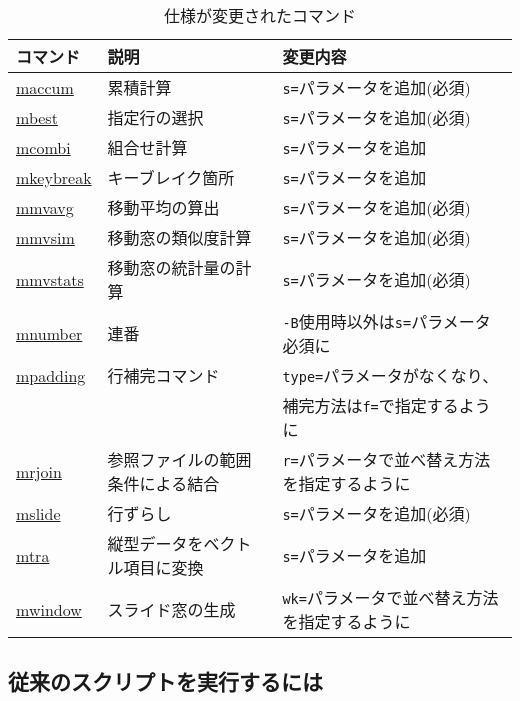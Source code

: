 \begin{table}[!htbp]
\begin{center}
\caption{仕様が変更されたコマンド\label{tbl:changed_commands}}
{\small
  \begin{tabular}{l|l|l} \hline
コマンド                             & 説明               & 変更内容 \\ \hline
\hyperref[sect:maccum]{maccum}       & 累積計算           & \verb|s=|パラメータを追加(必須) \\
\hyperref[sect:mbest]{mbest}         & 指定行の選択       & \verb|s=|パラメータを追加(必須) \\
\hyperref[sect:mcombi]{mcombi}       & 組合せ計算         & \verb|s=|パラメータを追加 \\
\hyperref[sect:mkeybreak]{mkeybreak} & キーブレイク箇所   & \verb|s=|パラメータを追加 \\
\hyperref[sect:mmvavg]{mmvavg}       & 移動平均の算出     & \verb|s=|パラメータを追加(必須) \\
\hyperref[sect:mmvsim]{mmvsim}       & 移動窓の類似度計算 & \verb|s=|パラメータを追加(必須) \\
\hyperref[sect:mmvstats]{mmvstats}   & 移動窓の統計量の計算 & \verb|s=|パラメータを追加(必須) \\
\hyperref[sect:mnumber]{mnumber}     & 連番               & \verb|-B|使用時以外は\verb|s=|パラメータ必須に \\
\hyperref[sect:mpadding]{mpadding}   & 行補完コマンド     & \verb|type=|パラメータがなくなり、 \\
                                     &                    & 補完方法は\verb|f=|で指定するように \\
\hyperref[sect:mrjoin]{mrjoin}       & 参照ファイルの範囲条件による結合 & \verb|r=|パラメータで並べ替え方法を指定するように \\
\hyperref[sect:mslide]{mslide}       & 行ずらし           & \verb|s=|パラメータを追加(必須) \\
\hyperref[sect:mtra]{mtra}           & 縦型データをベクトル項目に変換 & \verb|s=|パラメータを追加 \\
\hyperref[sect:mwindow]{mwindow}     & スライド窓の生成   & \verb|wk=|パラメータで並べ替え方法を指定するように \\

\hline
  \end{tabular}
  }
  \end{center}
\end{table}

\subsection{従来のスクリプトを実行するには\label{sect:howtomodify}}

